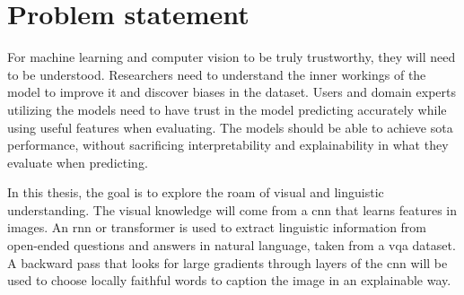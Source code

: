 \label{sec:1_2_problem_statement}

\section{Problem statement}

For machine learning and computer vision to be truly trustworthy, they will need to be understood. Researchers need to understand the inner workings of the model to improve it and discover biases in the dataset. Users and domain experts utilizing the models need to have trust in the model predicting accurately while using useful features when evaluating. The models should be able to achieve \gls{sota} performance, without sacrificing interpretability and explainability in what they evaluate when predicting. 

In this thesis, the goal is to explore the roam of visual and linguistic understanding.
The visual knowledge will come from a \gls{cnn} that learns features in images. An \gls{rnn} \cite{rumelhartLearningRepresentationsBackpropagating1986, choLearningPhraseRepresentations2014, sutskeverSequenceSequenceLearning2014, bahdanauNeuralMachineTranslation2016} or transformer is used to extract linguistic information from open-ended questions and answers in natural language, taken from a \gls{vqa} dataset. A backward pass that looks for large gradients through layers of the \gls{cnn} will be used to choose locally faithful words to caption the image in an explainable way. 



